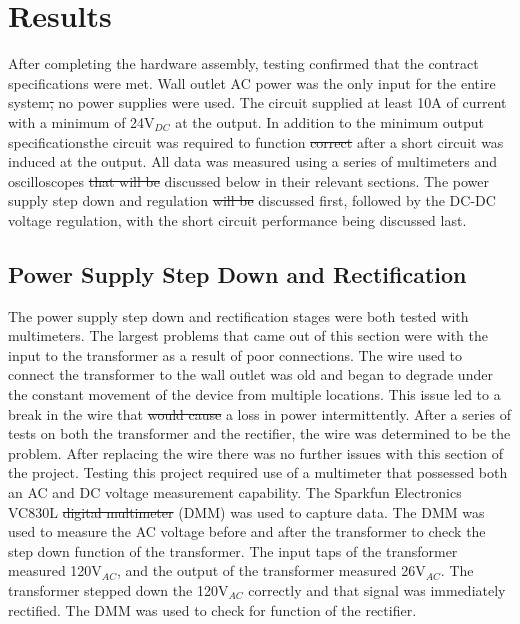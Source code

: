 \documentclass[11pt]{article}
\providecommand{\DIFadd}[1]{{\protect\color{blue}\uwave{#1}}} %
\providecommand{\DIFdel}[1]{{\protect\color{red}\sout{#1}}}                      %
\providecommand{\DIFaddbegin}{} %
\providecommand{\DIFaddend}{} %
\providecommand{\DIFdelbegin}{} %
\providecommand{\DIFdelend}{} %
\newcommand{\DIFscaledelfig}{0.5}
\newlength{\DIFdelgraphicswidth} %
\newlength{\DIFdelgraphicsheight} %
\newcommand{\DIFaddincludegraphics}[2][]{{\color{blue}\fbox{\DIFOincludegraphics[#1]{#2}}}} %
\newcommand{\DIFdelincludegraphics}[2][]{%
\sbox{\DIFdelgraphicsbox}{\DIFOincludegraphics[#1]{#2}}%
\settoboxwidth{\DIFdelgraphicswidth}{\DIFdelgraphicsbox} %
\settoboxtotalheight{\DIFdelgraphicsheight}{\DIFdelgraphicsbox} %
\scalebox{\DIFscaledelfig}{%
\parbox[b]{\DIFdelgraphicswidth}{\usebox{\DIFdelgraphicsbox}\\[-\baselineskip] \rule{\DIFdelgraphicswidth}{0em}}\llap{\resizebox{\DIFdelgraphicswidth}{\DIFdelgraphicsheight}{%
\setlength{\unitlength}{\DIFdelgraphicswidth}%
\begin{picture}(1,1)%
\thicklines\linethickness{2pt} %
{\color[rgb]{1,0,0}\put(0,0){\framebox(1,1){}}}%
{\color[rgb]{1,0,0}\put(0,0){\line( 1,1){1}}}%
{\color[rgb]{1,0,0}\put(0,1){\line(1,-1){1}}}%
\end{picture}%
}\hspace*{3pt}}} %
} %
\DeclareRobustCommand{\DIFaddbegin}{\DIFOaddbegin \let\includegraphics\DIFaddincludegraphics} %
\DeclareRobustCommand{\DIFaddend}{\DIFOaddend \let\includegraphics\DIFOincludegraphics} %
\DeclareRobustCommand{\DIFdelbegin}{\DIFOdelbegin \let\includegraphics\DIFdelincludegraphics} %
\DeclareRobustCommand{\DIFdelend}{\DIFOaddend \let\includegraphics\DIFOincludegraphics} %
\begin{document}
\section{Results}
    After completing the hardware assembly, testing confirmed that the contract specifications were met. Wall outlet AC power was the only input for the entire system\DIFdelbegin \DIFdel{, }\DIFdelend \DIFaddbegin \DIFadd{; }\DIFaddend no power supplies were used. The circuit supplied at least 10A of current with a minimum of 24V$_{DC}$ at the output. In addition to the minimum output specifications\DIFaddbegin \DIFadd{, }\DIFaddend the circuit was required to function \DIFdelbegin \DIFdel{correct }\DIFdelend \DIFaddbegin \DIFadd{correctly }\DIFaddend after a short circuit was induced at the output. All data was measured using a series of multimeters and oscilloscopes \DIFdelbegin \DIFdel{that will be }\DIFdelend discussed below in their relevant sections. The power supply step down and regulation \DIFdelbegin \DIFdel{will be }\DIFdelend \DIFaddbegin \DIFadd{are }\DIFaddend discussed first, followed by the DC-DC voltage regulation, with the short circuit performance being discussed last. 

    \subsection{Power Supply Step Down and Rectification}
    The power supply step down and rectification stages were both tested with multimeters. The largest problems that came out of this section were with the input to the transformer as a result of poor connections. The wire used to connect the transformer to the wall outlet was old and began to degrade under the constant movement of the device from multiple locations. This issue led to a break in the wire that \DIFdelbegin \DIFdel{would cause }\DIFdelend \DIFaddbegin \DIFadd{caused }\DIFaddend a loss in power intermittently. After a series of tests on both the transformer and the rectifier, the wire was determined to be the problem. After replacing the wire there was no further issues with this section of the project. Testing this project required use of a multimeter that possessed both an AC and DC voltage measurement capability. The Sparkfun Electronics VC830L \DIFdelbegin \DIFdel{digital multimeter }\DIFdelend \DIFaddbegin \DIFadd{Digital Multimeter }\DIFaddend (DMM) was used to capture data. The DMM was used to measure the AC voltage before and after the transformer to check the step down function of the transformer. The input taps of the transformer measured 120V$_{AC}$, and the output of the transformer measured 26V$_{AC}$. The transformer stepped down the 120V$_{AC}$ correctly and that signal was immediately rectified. The DMM was used to check for function of the rectifier.
\end{document}
